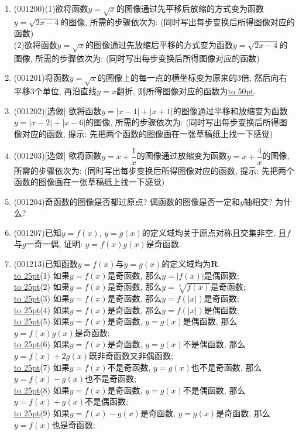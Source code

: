 \documentclass[10pt,a4paper]{article}
\newcommand{\blank}[1]{\underline{\hbox to #1pt{}}}
\begin{document}
\begin{enumerate}[1.]
\item {\tiny (001200)}(1)欲将函数$y=\sqrt{x}$的图像通过先平移后放缩的方式变为函数$y=\sqrt{2x-4}$的图像, 所需的步骤依次为: (同时写出每步变换后所得图像对应的函数)\\ 
(2)欲将函数$y=\sqrt{x}$的图像通过先放缩后平移的方式变为函数$y=\sqrt{2x-4}$的图像, 所需的步骤依次为: (同时写出每步变换后所得图像对应的函数)
\item {\tiny (001201)}将函数$y=\sqrt{x}$的图像上的每一点的横坐标变为原来的$3$倍, 然后向右平移$3$个单位, 再沿直线$y=x$翻折, 则所得图像对应的函数为\blank{50}.
\item {\tiny (001202)}[选做]
欲将函数$y=|x-1|+|x+1|$的图像通过平移和放缩变为函数$y=|x-2|+|x-6|$的图像, 所需的步骤依次为: (同时写出每步变换后所得图像对应的函数, 提示: 先把两个函数的图像画在一张草稿纸上找一下感觉)
\item {\tiny (001203)}[选做]
欲将函数$y=x+\dfrac{1}{x}$的图像通过放缩变为函数$y=x+\dfrac{4}{x}$的图像, 所需的步骤依次为: (同时写出每步变换后所得图像对应的函数, 提示: 先把两个函数的图像画在一张草稿纸上找一下感觉)
\item {\tiny (001204)}奇函数的图像是否都过原点? 偶函数的图像是否一定和$y$轴相交? 为什么?
\item {\tiny (001207)}已知$y=f(x)$, $y=g(x)$的定义域均关于原点对称且交集非空, 且$f$与$g$一奇一偶, 证明: $y=f(x)g(x)$是奇函数.
\item {\tiny (001213)}已知函数$y=f(x)$与$y=g(x)$的定义域均为$\mathbf{R}$.\\ 
\blank{25}(1) 如果$y=f(x)$是奇函数, 那么$y=|f(x)|$是偶函数;\\ 
\blank{25}(2) 如果$y=f(x)$是奇函数, 那么$y=\sqrt[3]{f(x)}$是奇函数;\\ 
\blank{25}(3) 如果$y=f(x)$是奇函数, 那么$y=f(|x|)$是奇函数;\\ 
\blank{25}(4) 如果$y=f(x)$是奇函数, 那么$y=f(|x|)$是偶函数;\\ 
\blank{25}(5) 如果$y=f(x)$是奇函数, $y=g(x)$是偶函数, 那么$y=f(x)g(x)$是奇函数;\\ 
\blank{25}(6) 如果$y=f(x)$是奇函数, $y=g(x)$不是偶函数, 那么$y=f(x)+2g(x)$既非奇函数又非偶函数;\\ 
\blank{25}(7) 如果$y=f(x)$不是奇函数, $y=g(x)$也不是奇函数, 那么$y=f(x)-g(x)$也不是奇函数;\\ 
\blank{25}(8) 如果$y=f(x)$是奇函数, $y=g(x)$不是偶函数, 那么$y=f(x)+g(x)$不是偶函数;\\ 
\blank{25}(9) 如果$y=f(x)-g(x)$是奇函数, $y=g(x)$是奇函数, 那么$y=f(x)$也是奇函数;\\ 

\end{enumerate}
\end{document}
